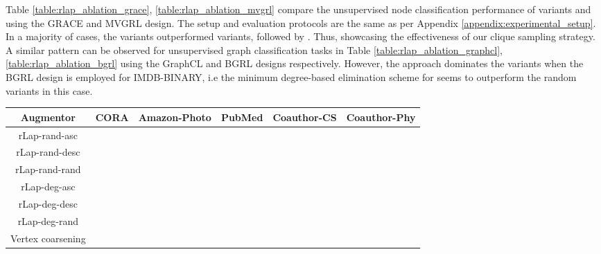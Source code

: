 \documentclass{article}
\theoremstyle{plain}
\theoremstyle{definition}
\theoremstyle{remark}
\begin{document}
Table \ref{table:rlap_ablation_grace}, \ref{table:rlap_ablation_mvgrl} compare the unsupervised node classification performance of  variants and  using the GRACE and MVGRL design. The setup and evaluation protocols are the same as per Appendix \ref{appendix:experimental_setup}. In a majority of cases, the  variants outperformed  variants, followed by . Thus, showcasing the effectiveness of our clique sampling strategy. A similar pattern can be observed for unsupervised graph classification tasks in Table \ref{table:rlap_ablation_graphcl}, \ref{table:rlap_ablation_bgrl} using the GraphCL and BGRL designs respectively. However, the  approach dominates the  variants when the BGRL design is employed for IMDB-BINARY, i.e the minimum degree-based elimination scheme for  seems to outperform the random variants in this case.

\begin{table*}[ht!]
\centering
\caption{Evaluation (in accuracy) on benchmark node datasets with \textbf{GRACE} design and  variants.}
\label{table:rlap_ablation_grace}
\vskip 0.15in
\begin{center}
\begin{small}
\begin{sc}
\begin{tabular}{c|c|c|c|c|c}
\toprule
Augmentor & CORA & Amazon-Photo & PubMed & Coauthor-CS & Coauthor-Phy \\
\midrule
rLap-rand-asc &  &  &  &    &  \\
rLap-rand-desc &   &  &  &  &  \underline{} \\
rLap-rand-rand &  & \underline{} & \underline{} &   &  \\
rLap-deg-asc  &    &  &  & \underline{} &   \\
rLap-deg-desc & \underline{} &   &  &  &  \\
rLap-deg-rand &  &  &  &  &  \\
Vertex coarsening &  &  &  &  &  \\
\bottomrule
\end{tabular}
\end{sc}
\end{small}
\end{center}
\vskip -0.1in
\end{table*}
\end{document}
